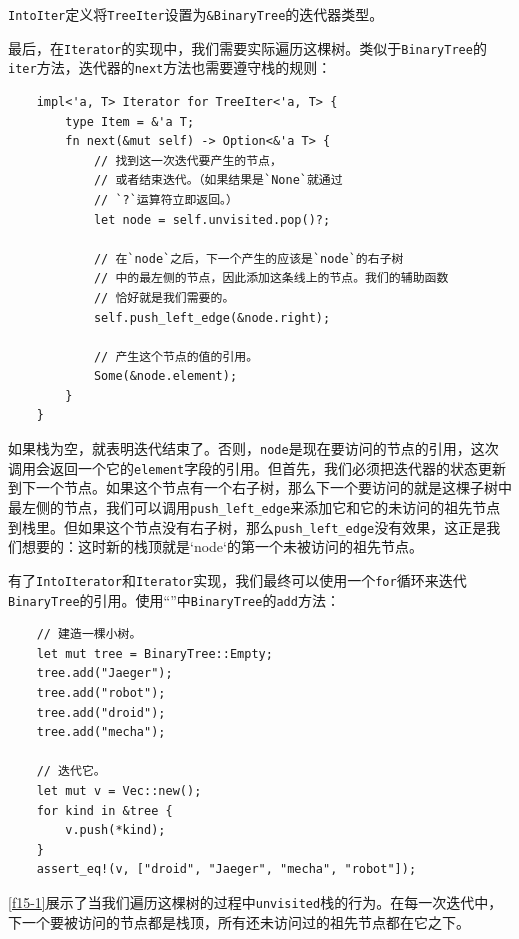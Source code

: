 \texttt{IntoIter}定义将\texttt{TreeIter}设置为\texttt{\&BinaryTree}的迭代器类型。

最后，在\texttt{Iterator}的实现中，我们需要实际遍历这棵树。类似于\texttt{BinaryTree}的\texttt{iter}方法，迭代器的\texttt{next}方法也需要遵守栈的规则：
\begin{verbatim}
    impl<'a, T> Iterator for TreeIter<'a, T> {
        type Item = &'a T;
        fn next(&mut self) -> Option<&'a T> {
            // 找到这一次迭代要产生的节点，
            // 或者结束迭代。（如果结果是`None`就通过
            // `?`运算符立即返回。）
            let node = self.unvisited.pop()?;

            // 在`node`之后，下一个产生的应该是`node`的右子树
            // 中的最左侧的节点，因此添加这条线上的节点。我们的辅助函数
            // 恰好就是我们需要的。
            self.push_left_edge(&node.right);

            // 产生这个节点的值的引用。
            Some(&node.element);
        }
    }
\end{verbatim}

如果栈为空，就表明迭代结束了。否则，\texttt{node}是现在要访问的节点的引用，这次调用会返回一个它的\texttt{element}字段的引用。但首先，我们必须把迭代器的状态更新到下一个节点。如果这个节点有一个右子树，那么下一个要访问的就是这棵子树中最左侧的节点，我们可以调用\texttt{push\_left\_edge}来添加它和它的未访问的祖先节点到栈里。但如果这个节点没有右子树，那么\texttt{push\_left\_edge}没有效果，这正是我们想要的：这时新的栈顶就是`node`的第一个未被访问的祖先节点。

有了\texttt{IntoIterator}和\texttt{Iterator}实现，我们最终可以使用一个\texttt{for}循环来迭代\texttt{BinaryTree}的引用。使用“”中\texttt{BinaryTree}的\texttt{add}方法：
\begin{verbatim}
    // 建造一棵小树。
    let mut tree = BinaryTree::Empty;
    tree.add("Jaeger");
    tree.add("robot");
    tree.add("droid");
    tree.add("mecha");

    // 迭代它。
    let mut v = Vec::new();
    for kind in &tree {
        v.push(*kind);
    }
    assert_eq!(v, ["droid", "Jaeger", "mecha", "robot"]);
\end{verbatim}

\autoref{f15-1}展示了当我们遍历这棵树的过程中\texttt{unvisited}栈的行为。在每一次迭代中，下一个要被访问的节点都是栈顶，所有还未访问过的祖先节点都在它之下。

